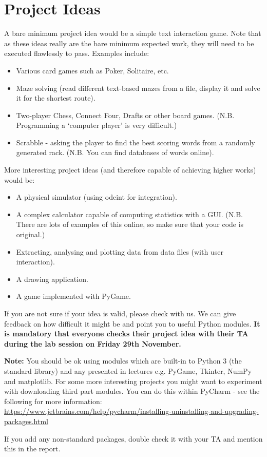 \documentclass[12pt]{report}
\begin{document}
\section*{Project Ideas}

A bare minimum project idea would be a simple text interaction game. Note that as these ideas really are the bare minimum expected work, they will need to be executed flawlessly to pass. Examples include:
\begin{itemize}
    \item Various card games such as Poker, Solitaire, etc.
    \item Maze solving (read different text-based mazes from a file, display it and solve it for the shortest route).
    \item Two-player Chess, Connect Four, Drafts or other board games. (N.B. Programming a `computer player' is very difficult.)
    \item Scrabble - asking the player to find the best scoring words from a randomly generated rack. (N.B. You can find databases of words online).
\end{itemize}

\bigskip

More interesting project ideas (and therefore capable of achieving higher works) would be:
\begin{itemize}
    \item A physical simulator (using odeint for integration).
    \item A complex calculator capable of computing statistics with a GUI. (N.B. There are lots of examples of this online, so make sure that your code is original.)
    \item Extracting, analysing and plotting data from data files (with user interaction).
    \item A drawing application.
    \item A game implemented with PyGame.
\end{itemize}

If you are not sure if your idea is valid, please check with us. We can give feedback on how difficult it might be and point you to useful Python modules. \textbf{It is mandatory that everyone checks their project idea with their TA during the lab session on Friday 29th November.} 

\medskip

\textbf{Note:} You should be ok using modules which are built-in to Python 3 (the standard library) and any presented in lectures e.g. PyGame, Tkinter, NumPy and matplotlib. For some more interesting projects you might want to experiment with downloading third part modules. You can do this within PyCharm - see the following for more information: \url{https://www.jetbrains.com/help/pycharm/installing-uninstalling-and-upgrading-packages.html}

If you add any non-standard packages, double check it with your TA and mention this in the report.
\end{document}
